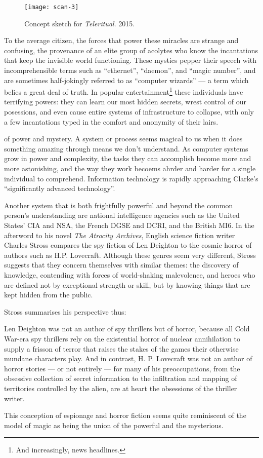 \documentclass[a4paper,nobib]{tufte-handout}
\begin{document}
\begin{figure}
    \texttt{[image: scan-3]}
    \caption{Concept sketch for \emph{Teleritual}. 2015.}
    \label{fig:sketch1}
\end{figure}

To the average citizen, the forces that power these miracles are strange and confusing, the provenance of an elite group of acolytes who know the incantations that keep the invisible world functioning. These mystics pepper their speech with incomprehensible terms such as ``ethernet'', ``daemon'', and ``magic number'', and are sometimes half-jokingly referred to as ``computer wizards'' --- a term which belies a great deal of truth. In popular entertainment\footnote{And increasingly, news headlines.} these individuals have terrifying powers: they can learn our most hidden secrets, wrest control of our posessions, and even cause entire systems of infrastructure to collapse, with only a few incantations typed in the comfort and anonymity of their lairs.

 of power and mystery. A system or process seems magical to us when it does something amazing through means we don't understand. As computer systems grow in power and complexity, the tasks they can accomplish become more and more astonishing, and the way they work becoems ahrder and harder for a single individual to comprehend. Information technology is rapidly approaching Clarke's ``significantly advanced technology''.

Another system that is both frightfully powerful and beyond the common person's understanding are national intelligence agencies such as the United States' CIA and NSA, the French DGSE and DCRI, and the British MI6. In the afterword to his novel \emph{The Atrocity Archives}, English science fiction writer Charles Stross compares the spy fiction of Len Deighton to the cosmic horror of authors such as H.P. Lovecraft. Although these genres seem very different, Stross suggests that they concern themselves with similar themes: the discovery of knowledge, contending with forces of world-shaking malevolence, and heroes who are defined not by exceptional strength or skill, but by knowing things that are kept hidden from the public.\autocite{stross2008}

Stross summarises his perspective thus:
\begin{displayquote}
    Len Deighton was not an author of spy thrillers but of horror, because all Cold War-era spy thrillers rely on the existential horror of nuclear annihilation to supply a frisson of terror that raises the stakes of the games their otherwise mundane characters play. And in contrast, H. P. Lovecraft was not an author of horror stories --- or not entirely --- for many of his preoccupations, from the obsessive collection of secret information to the infiltration and mapping of territories controlled by the alien, are at heart the obsessions of the thriller writer.\autocite{stross2008}
\end{displayquote}
This conception of espionage and horror fiction seems quite reminiscent of the model of magic as being the union of the powerful and the mysterious.
\end{document}
